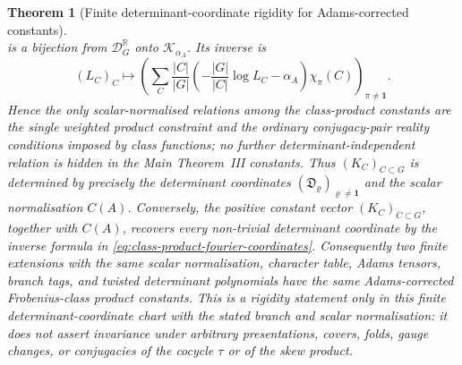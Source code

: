 \documentclass[11pt,a4paper]{amsart}
\theoremstyle{plain}
\newtheorem{theorem}{Theorem}[section]
\theoremstyle{definition}
\theoremstyle{remark}
\begin{document}
\begin{theorem}[Finite determinant-coordinate rigidity for Adams-corrected constants]
\begin{equation}
  \end{equation}
  is a bijection from \(\mathcal D_G^{\mathbb R}\) onto
  \(\mathscr K_{\alpha_A}\).  Its inverse is
  \begin{equation}\label{eq:class-product-rigidity-chart-inverse}
    (L_C)_C\longmapsto
    \left(
      \sum_C\frac{|C|}{|G|}
      \left(-\frac{|G|}{|C|}\log L_C-\alpha_A\right)
      \chi_\pi(C)
    \right)_{\pi\ne\mathbf1}.
  \end{equation}
  Hence the only scalar-normalised relations among the class-product
  constants are the single weighted product constraint and the ordinary
  conjugacy-pair reality conditions imposed by class functions; no further
  determinant-independent relation is hidden in the Main Theorem~III
  constants.
  Thus \((K_C)_{C\subset G}\) is determined by precisely the determinant
  coordinates \((\mathfrak D_\varrho)_{\varrho\ne\mathbf1}\) and the scalar
  normalisation \(C(A)\).  Conversely, the positive constant vector
  \((K_C)_{C\subset G}\), together with \(C(A)\), recovers every
  non-trivial determinant coordinate by the inverse formula in
  \eqref{eq:class-product-fourier-coordinates}.  Consequently two finite
  extensions with the same scalar normalisation, character table, Adams
  tensors, branch tags, and twisted determinant polynomials have the same
  Adams-corrected Frobenius-class product constants.  This is a rigidity
  statement only in this finite determinant-coordinate chart with the stated
  branch and scalar normalisation:
  it does not assert invariance under arbitrary presentations, covers, folds,
  gauge changes, or conjugacies of the cocycle \(\tau\) or of the skew product.
\end{theorem}
\end{document}
